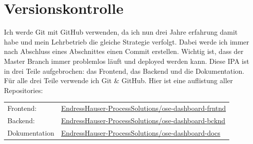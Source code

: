 \section{Versionskontrolle}
Ich werde Git mit GitHub verwenden, da ich nun drei Jahre erfahrung damit habe und mein Lehrbetrieb die gleiche Strategie verfolgt. Dabei werde ich immer nach Abschluss eines Abschnittes einen Commit erstellen. Wichtig ist, dass der Master Branch immer problemlos läuft und deployed werden kann.
\newline
\newline
Diese IPA ist in drei Teile aufgebrochen: das Frontend, das Backend und die Dokumentation. Für alle drei Teile verwende ich Git \& GitHub. Hier ist eine auflistung aller Repositories:
\begin{table}[htp]
  \begin{tabularx}{\textwidth}{l X}
  Frontend: & \href{https://github.com/EndressHauser-ProcessSolutions/ose-dashboard-frntnd}{EndressHauser-ProcessSolutions/ose-dashboard-frntnd} \\
  Backend: & \href{https://github.com/EndressHauser-ProcessSolutions/ose-dashboard-bcknd}{EndressHauser-ProcessSolutions/ose-dashboard-bcknd} \\
  Dokumentation & \href{https://github.com/EndressHauser-ProcessSolutions/ose-dashboard-docs}{EndressHauser-ProcessSolutions/ose-dashboard-docs} \\
  \end{tabularx}
\end{table}

